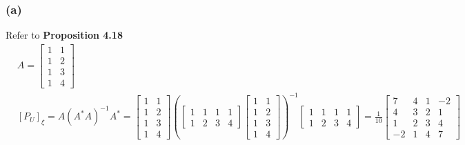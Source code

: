 \documentclass{article}
\begin{document}
\subsubsection*{(a)}
Refer to \textbf{Proposition 4.18}
\begin{equation*}
    \begin{split}
        &A = \begin{bmatrix}
            1 & 1 \\
            1 & 2 \\
            1 & 3 \\
            1 & 4
        \end{bmatrix}\\
        &[P_U]_\xi = A(A^*A)^{-1}A^* = \begin{bmatrix}
            1 & 1 \\
            1 & 2 \\
            1 & 3 \\
            1 & 4
        \end{bmatrix} (\begin{bmatrix}
            1 & 1 & 1 & 1 \\
            1 & 2 & 3 & 4
        \end{bmatrix} \begin{bmatrix}
            1 & 1 \\
            1 & 2 \\
            1 & 3 \\
            1 & 4
        \end{bmatrix})^{-1} \begin{bmatrix}
            1 & 1 & 1 & 1 \\
            1 & 2 & 3 & 4
        \end{bmatrix} = \frac{1}{10}\begin{bmatrix}
            7 & 4 & 1 & -2 \\
            4 & 3 & 2 & 1 \\
            1 & 2 & 3 &4 \\
            -2 & 1 & 4 & 7
        \end{bmatrix}
    \end{split}
\end{equation*}
\end{document}
